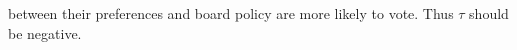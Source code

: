 between their preferences and board policy are more likely to vote. Thus $\tau$ should be negative.  %
% 
% 
% 
